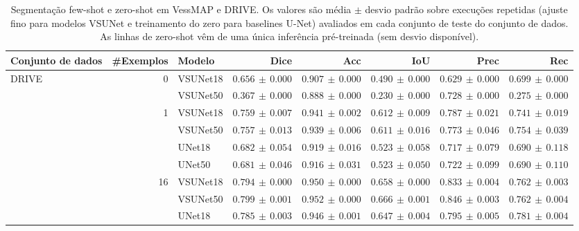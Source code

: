 \documentclass[%
reprint,
nofootinbib,
 amsmath,amssymb,
aps,
superscriptaddress,
showkeys,
longbibliography
]{revtex4-1}
\begin{document}
\begin{table}[t]
\begin{table}[t]
\begin{table}[t]
    \caption{Segmentação few-shot e zero-shot em VessMAP e DRIVE. Os valores são média $\pm$ desvio padrão sobre execuções repetidas (ajuste fino para modelos VSUNet e treinamento do zero para baselines U-Net) avaliados em cada conjunto de teste do conjunto de dados. As linhas de zero-shot vêm de uma única inferência pré-treinada (sem desvio disponível).}
    \label{tab:combined_fewshot}
    \centering
    \begingroup
    \small
    \setlength{\tabcolsep}{4pt}
    \renewcommand{\arraystretch}{1.15}
    \begin{tabular}{l r l r r r r r}
        \hline
        \textbf{Conjunto de dados} & \textbf{\#Exemplos} & \textbf{Modelo} & \textbf{Dice} & \textbf{Acc} & \textbf{IoU} & \textbf{Prec} & \textbf{Rec} \\
        \hline
        \multirow{10}{*}{DRIVE} & \multirow{2}{*}{0} & VSUNet18 & $0.656 \,\pm\, 0.000$ & $0.907 \,\pm\, 0.000$ & $0.490 \,\pm\, 0.000$ & $0.629 \,\pm\, 0.000$ & $0.699 \,\pm\, 0.000$ \\
         &  & VSUNet50 & $0.367 \,\pm\, 0.000$ & $0.888 \,\pm\, 0.000$ & $0.230 \,\pm\, 0.000$ & $0.728 \,\pm\, 0.000$ & $0.275 \,\pm\, 0.000$ \\
         \cline{2-8}
         & \multirow{4}{*}{1} & VSUNet18 & $0.759 \,\pm\, 0.007$ & $0.941 \,\pm\, 0.002$ & $0.612 \,\pm\, 0.009$ & $0.787 \,\pm\, 0.021$ & $0.741 \,\pm\, 0.019$ \\
         &  & VSUNet50 & $0.757 \,\pm\, 0.013$ & $0.939 \,\pm\, 0.006$ & $0.611 \,\pm\, 0.016$ & $0.773 \,\pm\, 0.046$ & $0.754 \,\pm\, 0.039$ \\
         &  & UNet18 & $0.682 \,\pm\, 0.054$ & $0.919 \,\pm\, 0.016$ & $0.523 \,\pm\, 0.058$ & $0.717 \,\pm\, 0.079$ & $0.690 \,\pm\, 0.118$ \\
         &  & UNet50 & $0.681 \,\pm\, 0.046$ & $0.916 \,\pm\, 0.031$ & $0.523 \,\pm\, 0.050$ & $0.722 \,\pm\, 0.099$ & $0.690 \,\pm\, 0.110$ \\
         \cline{2-8}
         & \multirow{4}{*}{16} & VSUNet18 & $0.794 \,\pm\, 0.000$ & $0.950 \,\pm\, 0.000$ & $0.658 \,\pm\, 0.000$ & $0.833 \,\pm\, 0.004$ & $0.762 \,\pm\, 0.003$ \\
         &  & VSUNet50 & $0.799 \,\pm\, 0.001$ & $0.952 \,\pm\, 0.000$ & $0.666 \,\pm\, 0.001$ & $0.846 \,\pm\, 0.003$ & $0.762 \,\pm\, 0.004$ \\
         &  & UNet18 & $0.785 \,\pm\, 0.003$ & $0.946 \,\pm\, 0.001$ & $0.647 \,\pm\, 0.004$ & $0.795 \,\pm\, 0.005$ & $0.781 \,\pm\, 0.004$ \\

\end{tabular}
\end{table}
\end{table}
\end{table}
\end{document}
